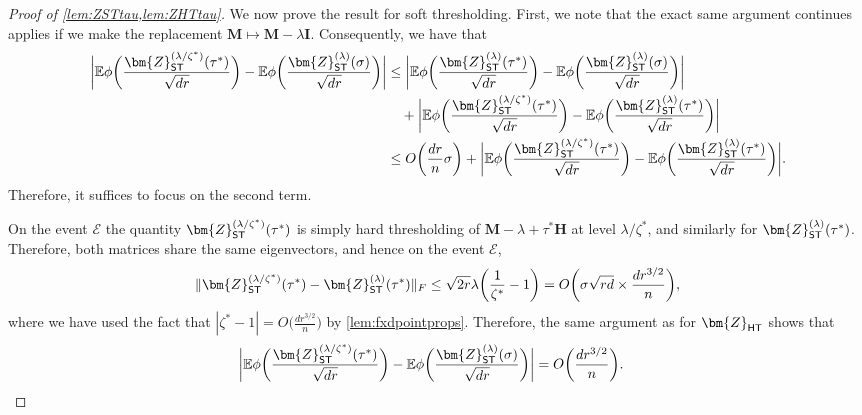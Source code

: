 \documentclass[10pt]{article}
\newcommand{\s}{^*}
\theoremstyle{definition}
\begin{document}
\begin{proof}[Proof of \cref{lem:ZSTtau,lem:ZHTtau}]
 
We now prove the result for soft thresholding.  First, we note that the exact same argument continues applies if we
make the replacement $\bm{M} \mapsto \bm{M} - \lambda \bm{I}$.  Consequently, we have that 
\begin{align}
\bigg|     \mathbb{E} \phi\bigg( \frac{\bm{Z}_{{\sf ST}}^{(\lambda/\zeta\s)}(\tau\s)}{\sqrt{dr}} \bigg) - \mathbb{E} \phi\bigg( \frac{\bm{Z}_{{\sf ST}}^{(\lambda)}(\sigma)}{\sqrt{dr}} \bigg) \bigg| &\leq \bigg|     \mathbb{E} \phi\bigg( \frac{\bm{Z}_{{\sf ST}}^{(\lambda)}(\tau\s)}{\sqrt{dr}} \bigg) - \mathbb{E} \phi\bigg( \frac{\bm{Z}_{{\sf ST}}^{(\lambda)}(\sigma)}{\sqrt{dr}} \bigg) \bigg| \\
&\quad + \bigg|     \mathbb{E} \phi\bigg( \frac{\bm{Z}_{{\sf ST}}^{(\lambda/\zeta\s)}(\tau\s)}{\sqrt{dr}} \bigg) - \mathbb{E} \phi\bigg( \frac{\bm{Z}_{{\sf ST}}^{(\lambda)}(\tau\s)}{\sqrt{dr}} \bigg) \bigg| \\
&\leq O\bigg( \frac{dr}{n} \sigma \bigg) + \bigg|     \mathbb{E} \phi\bigg( \frac{\bm{Z}_{{\sf ST}}^{(\lambda/\zeta\s)}(\tau\s)}{\sqrt{dr}} \bigg) - \mathbb{E} \phi\bigg( \frac{\bm{Z}_{{\sf ST}}^{(\lambda)}(\tau\s)}{\sqrt{dr}} \bigg) \bigg|.
\end{align}
Therefore, it suffices to focus on the second term.  

On the event $\mathcal{E}$ the quantity $\bm{Z}_{{\sf ST}}^{(\lambda/\zeta\s)}(\tau\s)$ is simply hard thresholding of $\bm{M} -\lambda + \tau\s \bm{H}$ at level $\lambda/\zeta\s$, and similarly for  $\bm{Z}_{{\sf ST}}^{(\lambda)}(\tau\s)$.  Therefore, both matrices share the same eigenvectors, and hence on the event $\mathcal{E}$,
\begin{align*}
    \|\bm{Z}_{{\sf ST}}^{(\lambda/\zeta\s)}(\tau\s) - \bm{Z}_{{\sf ST}}^{(\lambda)}(\tau\s) \|_F \leq \sqrt{2r} \lambda \bigg( \frac{1}{\zeta\s} - 1 \bigg) = O\bigg( \sigma \sqrt{rd} \times \frac{d r^{3/2}}{n} \bigg),
\end{align*}
where we have used the fact that $|\zeta\s  - 1 | = O\bigg( \frac{d r^{3/2}}{n} \bigg)$ by \cref{lem:fxdpointprops}.  Therefore, the same argument as for $\bm{Z}_{{\sf HT}}$ shows that 
\begin{align}
\bigg|     \mathbb{E} \phi\bigg( \frac{\bm{Z}_{{\sf ST}}^{(\lambda/\zeta\s)}(\tau\s)}{\sqrt{dr}} \bigg) - \mathbb{E} \phi\bigg( \frac{\bm{Z}_{{\sf ST}}^{(\lambda)}(\sigma)}{\sqrt{dr}} \bigg) \bigg| &= O\bigg( \frac{d r^{3/2}}{n} \bigg).
\end{align}
\end{proof}
\end{document}
